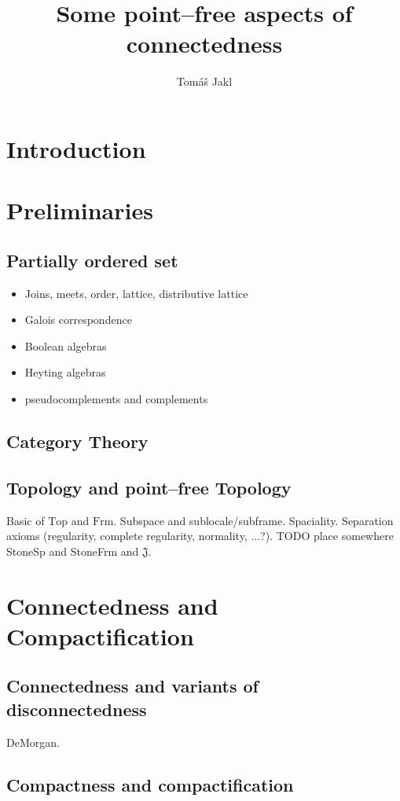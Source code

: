 \documentclass[12pt,a4paper,fleqn]{report}
\title{Some point--free aspects of connectedness}
\author{Tom\'a\v s Jakl}
\theoremstyle{newthmstyle}
\theoremstyle{newthmstyleNormal}
\newcommand\Frm{\ensuremath{\mathrm{Frm}}}
\newcommand\Top{\ensuremath{\mathrm{Top}}}
\newcommand\J{\ensuremath{\mathfrak{J}}}
\begin{document}
\maketitle
\tableofcontents


\chapter{Introduction}
\cite{picado2011frames}

\chapter{Preliminaries}
\section{Partially ordered set}
\begin{itemize}
    \item Joins, meets, order, lattice, distributive lattice
    \item Galois correspondence
    \item Boolean algebras
    \item Heyting algebras
    \item pseudocomplements and complements
\end{itemize}
\section{Category Theory}
\section{Topology and point--free Topology}
Basic of \Top{} and \Frm.
Subspace and sublocale/subframe.
Spaciality.
Separation axioms (regularity, complete regularity, normality, ...?).
TODO place somewhere StoneSp and StoneFrm and \J.

\chapter{Connectedness and Compactification}
\section{Connectedness and variants of disconnectedness}
DeMorgan.
\section{Compactness and compactification}
\end{document}
